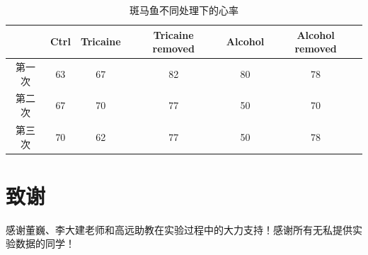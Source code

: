 \documentclass[UTF-8,10.5pt]{ctexart}
\begin{document}
\begin{center}
\begin{table}[hp]
    \centering
    \label{table}
    \caption{斑马鱼不同处理下的心率}
    \begin{tabular}{@{}cccccc@{}}
    \toprule
        & Ctrl & Tricaine & Tricaine removed & Alcohol & Alcohol removed \\ \midrule
    第一次 & 63   & 67      & 82              & 80      & 78              \\
    第二次 & 67   & 70      & 77              & 50      & 70              \\
    第三次 & 70   & 62      & 77              & 50      & 78              \\ \bottomrule
    \end{tabular}
    \end{table}
\end{center}
    \section{致谢}
    感谢董巍、李大建老师和高远助教在实验过程中的大力支持！感谢所有无私提供实验数据的同学！
\end{document}
